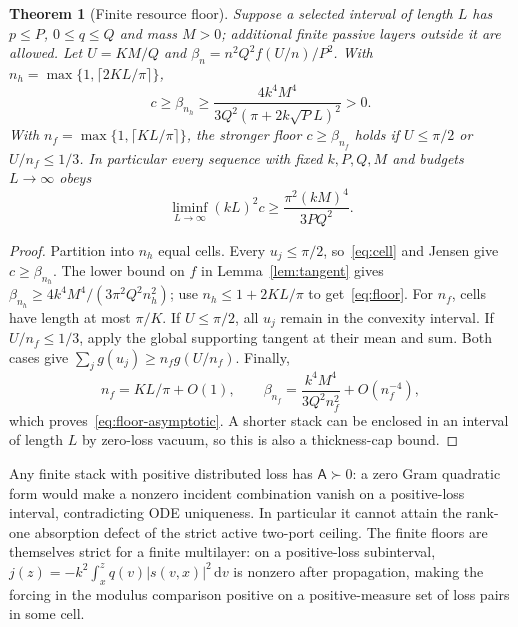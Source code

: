 \documentclass[11pt,a4paper]{article}
\newtheorem{theorem}{Theorem}[section]
\theoremstyle{remark}
\newcommand{\abs}[1]{\lvert #1\rvert}
\newcommand{\dd}{\,\mathrm d}
\begin{document}
\begin{theorem}[Finite resource floor]\label{thm:floor}
Suppose a selected interval of length $L$ has $p\leq P$, $0\leq q\leq Q$ and mass $M>0$; additional finite passive layers outside it are allowed. Let $U=KM/Q$ and $\beta_n=n^2Q^2f(U/n)/P^2$. With $n_h=\max\{1,\lceil2KL/\pi\rceil\}$,
\begin{equation}\label{eq:floor}
 c\geq\beta_{n_h}\geq\frac{4k^4M^4}{3Q^2(\pi+2k\sqrt P L)^2}>0.
\end{equation}
With $n_f=\max\{1,\lceil KL/\pi\rceil\}$, the stronger floor $c\geq\beta_{n_f}$ holds if $U\leq\pi/2$ or $U/n_f\leq1/3$. In particular every sequence with fixed $k,P,Q,M$ and budgets $L\to\infty$ obeys
\begin{equation}\label{eq:floor-asymptotic}
 \liminf_{L\to\infty}(kL)^2c\geq\frac{\pi^2(kM)^4}{3PQ^2}.
\end{equation}
\end{theorem}
\begin{proof}
Partition into $n_h$ equal cells. Every $u_j\leq\pi/2$, so~\eqref{eq:cell} and Jensen give $c\geq\beta_{n_h}$. The lower bound on $f$ in Lemma~\ref{lem:tangent} gives $\beta_{n_h}\geq4k^4M^4/(3\pi^2Q^2n_h^2)$; use $n_h\leq1+2KL/\pi$ to get~\eqref{eq:floor}. For $n_f$, cells have length at most $\pi/K$. If $U\leq\pi/2$, all $u_j$ remain in the convexity interval. If $U/n_f\leq1/3$, apply the global supporting tangent at their mean and sum. Both cases give $\sum_jg(u_j)\geq n_fg(U/n_f)$. Finally,
\[
 n_f=KL/\pi+O(1),\qquad
 \beta_{n_f}=\frac{k^4M^4}{3Q^2n_f^2}+O(n_f^{-4}),
\]
which proves~\eqref{eq:floor-asymptotic}. A shorter stack can be enclosed in an interval of length $L$ by zero-loss vacuum, so this is also a thickness-cap bound.
\end{proof}

Any finite stack with positive distributed loss has $\mathsf A\succ0$: a zero Gram quadratic form would make a nonzero incident combination vanish on a positive-loss interval, contradicting ODE uniqueness. In particular it cannot attain the rank-one absorption defect of the strict active two-port ceiling. The finite floors are themselves strict for a finite multilayer: on a positive-loss subinterval, $j(z)=-k^2\int_x^zq(v)\abs{s(v,x)}^2\dd v$ is nonzero after propagation, making the forcing in the modulus comparison positive on a positive-measure set of loss pairs in some cell.
\end{document}
